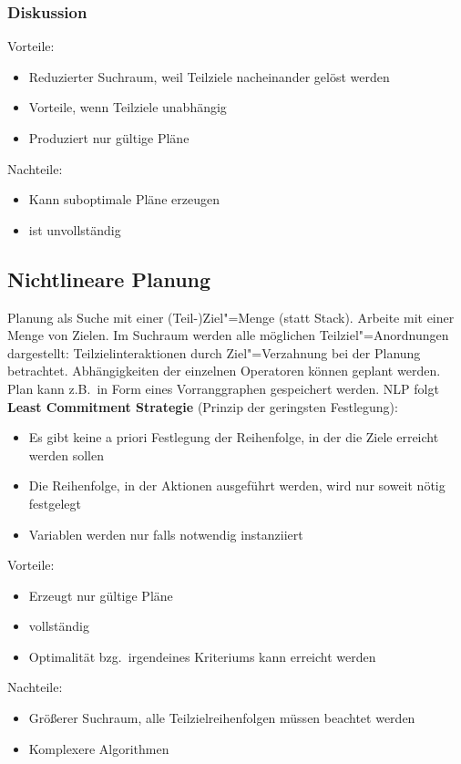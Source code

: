 \subsubsection{Diskussion}
Vorteile:
\begin{itemize}
	\item Reduzierter Suchraum, weil Teilziele nacheinander gelöst werden
	\item Vorteile, wenn Teilziele unabhängig
	\item Produziert nur gültige Pläne
\end{itemize}
Nachteile:
\begin{itemize}
	\item Kann suboptimale Pläne erzeugen
	\item ist unvollständig
\end{itemize}

\subsection{Nichtlineare Planung}
\label{ch06_nichtlinearePlanung}
Planung als Suche mit einer (Teil-)Ziel"=Menge (statt Stack). Arbeite mit einer Menge von Zielen.
Im Suchraum werden alle möglichen Teilziel"=Anordnungen dargestellt: Teilzielinteraktionen durch Ziel"=Verzahnung bei der Planung betrachtet.
Abhängigkeiten der einzelnen Operatoren können geplant werden.
Plan kann z.B.\ in Form eines Vorranggraphen gespeichert werden.
NLP folgt \textbf{Least Commitment Strategie} (Prinzip der geringsten Festlegung):
\begin{itemize}
	\item Es gibt keine a priori Festlegung der Reihenfolge, in der die Ziele erreicht werden sollen
	\item Die Reihenfolge, in der Aktionen ausgeführt werden, wird nur soweit nötig festgelegt
	\item Variablen werden nur falls notwendig instanziiert
\end{itemize}

Vorteile:
\begin{itemize}
	\item Erzeugt nur gültige Pläne
	\item vollständig
	\item Optimalität bzg.\ irgendeines Kriteriums kann erreicht werden
\end{itemize}
Nachteile:
\begin{itemize}
	\item Größerer Suchraum, alle Teilzielreihenfolgen müssen beachtet werden
	\item Komplexere Algorithmen
\end{itemize}

